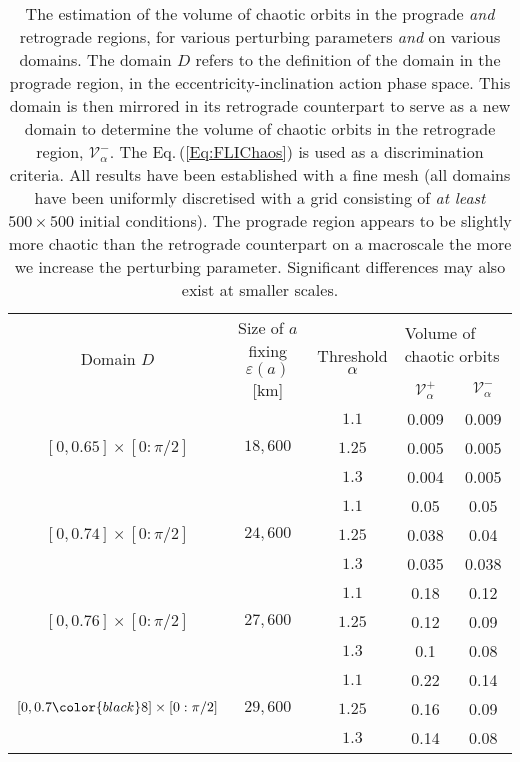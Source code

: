 \documentclass{amsart}
\theoremstyle{definition}
\theoremstyle{remark}
\numberwithin{equation}{section}
\begin{document}
\begin{table}
\centering
\setlength{\arrayrulewidth}{1.2pt}
\setlength{\arrayrulewidth}{1.2pt}
\begin{tabular}{c|cccc}
\hline
\multirow{2}{*}{Domain $D$}	&\multirow{2}{*}{Size of $a$ fixing $\varepsilon(a)$ [km]} & \multirow{2}{*}{Threshold $\alpha$} & \multicolumn{2}{l}{Volume of chaotic orbits} \\ 
	&							  & &  $\mathcal{V}_{\alpha}^{+}$ & $\mathcal{V}_{\alpha}^{-}$ \\
 \hline
 \hline
\multirow{3}{*}{$[0,0.65]\times[0:\pi/2]$}  & \multirow{3}{*}{$18,600$} & 		$1.1$ 	& 0.009 & 0.009  \\ 
  &  & 	$1.25$ 	& 0.005 & 0.005  \\ 
  &  & 	$1.3$ 	& 0.004 & 0.005  \\ 
\hline
\multirow{3}{*}{$[0,0.74]\times[0:\pi/2]$}  & \multirow{3}{*}{$24,600$} & $1.1$ 		& 0.05  & 0.05 \\ 
  &  & $1.25$ 	& 0.038& 0.04  \\ 
  &  & $1.3$ 	& 0.035 & 0.038 \\ 
\hline
\multirow{3}{*}{$[0,0.76]\times[0:\pi/2]$}  & \multirow{3}{*}{$27,600$} & 	   $1.1$  	& 0.18 & 0.12  \\ 
  &  & $1.25$  	& 0.12 & 0.09 \\ 
  &  & $1.3$    	& 0.1 & 0.08  \\ 
\hline
\multirow{3}{*}{$[0,0.7{\color{black}8}]\times[0:\pi/2]$}  & \multirow{3}{*}{$29,600$} & $1.1$ 		& 0.22 & 0.14 \\ 
  &  & $1.25$ 	& 0.16 & 0.09 \\ 
  &  & $1.3$ 	& 0.14 & 0.08 \\ 
 \hline
 \hline 
\end{tabular}
\caption{\label{Tab:ProVSRetro}
{\color{black}The} estimation of the volume of chaotic orbits in the prograde \textit{and} retrograde regions, for various perturbing parameters \textit{and} on various domains.  The domain $D$ refers to the definition of the domain in the prograde region, in the  eccentricity-inclination action phase space. This  domain is then mirrored in its retrograde counterpart to serve as a new domain to determine the volume of chaotic orbits in the retrograde region, $\mathcal{V}_{\alpha}^{-}$. {\color{black}The Eq.\,(\ref{Eq:FLIChaos}) is used as a discrimination criteria.}
All results have been established with a fine mesh (all domains have been uniformly discretised with a grid consisting of  \textit{at least} $500 \times 500$ initial conditions). 
The prograde region appears to be slightly more chaotic than the retrograde counterpart on a macroscale the more we increase the perturbing parameter. Significant differences may also exist at smaller scales.
}
\end{table}
\end{document}
